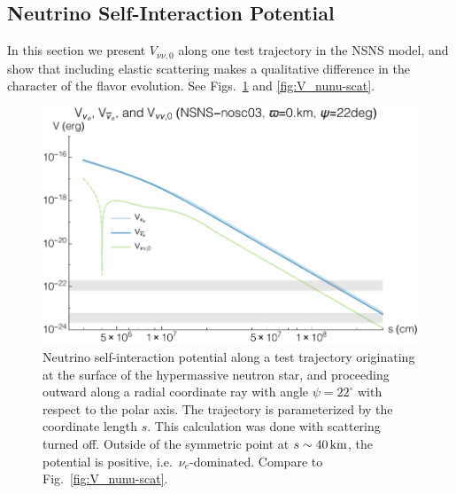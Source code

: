 \documentclass[aps,floatfix,prd,superscriptaddress,twocolumn]{revtex4-1}
\begin{document}
\subsection{Neutrino Self-Interaction Potential}
\label{ssec:V_nunu}
In this section we present $V_{\nu\nu,0}$ along one test trajectory in the NSNS
model, and show that including elastic scattering makes a qualitative
difference in the character of the flavor evolution.
See Figs.~\ref{fig:V_nunu-noscat} and \ref{fig:V_nunu-scat}.

\begin{figure}
  \includegraphics[width=\columnwidth]{20170619-potentials-Vnue_Vnua_Vnu-000Mo-022deg-noscat}
  \caption{Neutrino self-interaction potential along a test trajectory
    originating at the surface of the hypermassive neutron star, and
    proceeding outward along a radial coordinate ray with angle
    $\psi=22^{\circ}$ with respect to the polar axis.
    The trajectory is parameterized by the coordinate length $s$.
    This calculation was done with scattering turned off.
    Outside of the symmetric point at $s\sim40\,{\rm km}$, the potential is
    positive, i.e.\ $\nu_e$-dominated.
    Compare to Fig.~\ref{fig:V_nunu-scat}.
    }
  \label{fig:V_nunu-noscat}
\end{figure}
\end{document}
